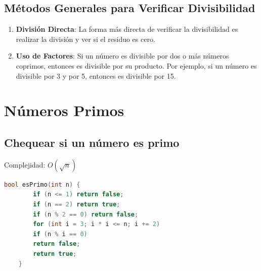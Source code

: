 \subsection{Métodos Generales para Verificar Divisibilidad}

\begin{enumerate}
	\item \textbf{División Directa}: La forma más directa de verificar la divisibilidad es realizar la división y ver si el residuo es cero.
	\item \textbf{Uso de Factores}: Si un número es divisible por dos o más números coprimos, entonces es divisible por su producto. Por ejemplo, si un número es divisible por 3 y por 5, entonces es divisible por 15.
\end{enumerate}


\section{Números Primos}

\subsection{Chequear si un número es primo}

Complejidad: \( O(\sqrt{n}) \)
\begin{lstlisting}[language=C++, caption={Chequear si un número es primo}]
	bool esPrimo(int n) {
		if (n <= 1) return false;
		if (n == 2) return true;
		if (n % 2 == 0) return false;
		for (int i = 3; i * i <= n; i += 2)
		if (n % i == 0)
		return false;
		return true;
	}
\end{lstlisting}


